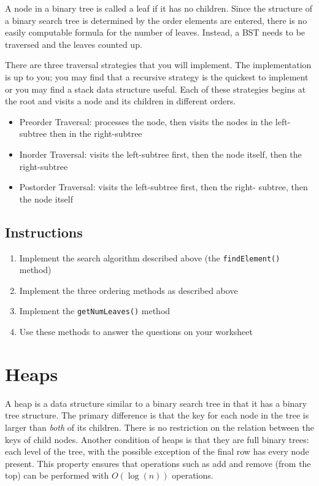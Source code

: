 \documentclass[12pt]{scrartcl}
\begin{document}
A node in a binary tree is called a leaf if it has no children.  Since 
the structure of a binary search tree is determined by the order 
elements are entered, there is no easily computable formula for the 
number of leaves.  Instead, a BST needs to be traversed and the leaves 
counted up.  

There are three traversal strategies that you will implement.  The 
implementation is up to you; you may find that a recursive strategy 
is the quickest to implement or you may find a stack data structure 
useful.  Each of these strategies begins at the root and visits a 
node and its children in different orders.

\begin{itemize}
  \item Preorder Traversal: processes the node, then visits the 
    nodes in the left-subtree then in the right-subtree 
  \item Inorder Traversal: visits the left-subtree first, then the node 
    itself, then the right-subtree
  \item Postorder Traversal: visits the left-subtree first, then the right-
    subtree, then the node itself
\end{itemize}

\subsection*{Instructions}

\begin{enumerate}
  \item Implement the search algorithm described above (the 
    \texttt{findElement()} method)
  \item Implement the three ordering methods as described above
  \item Implement the \texttt{getNumLeaves()} method 
  \item Use these methods to answer the questions on your worksheet 
\end{enumerate}

\section*{Heaps}
    
A heap is a data structure similar to a binary search tree in that 
it has a binary tree structure.  The primary difference is that the 
key for each node in the tree is larger than \emph{both} of its 
children. There is no restriction on the relation between the keys 
of child nodes.  Another condition of heaps is that they are full 
binary trees: each level of the tree, with the possible exception 
of the final row has every node present.  This property ensures that 
operations such as add and remove (from the top) can be performed 
with $O(\log(n))$ operations.
\end{document}
